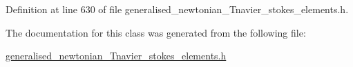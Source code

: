 Definition at line 630 of file generalised\+\_\+newtonian\+\_\+\+Tnavier\+\_\+stokes\+\_\+elements.\+h.



The documentation for this class was generated from the following file\+:\begin{DoxyCompactItemize}
\item 
\hyperlink{generalised__newtonian__Tnavier__stokes__elements_8h}{generalised\+\_\+newtonian\+\_\+\+Tnavier\+\_\+stokes\+\_\+elements.\+h}\end{DoxyCompactItemize}

